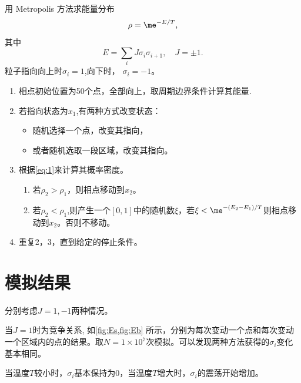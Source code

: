 \documentclass[12pt]{article}
\begin{document}
用 Metropolis 方法求能量分布
\begin{equation}
	\rho = \me^{-E/T},
	\label{eq:1}
\end{equation}
其中
\begin{equation}
	E = \sum_i J \sigma_i \sigma_{i+1}, \quad J = \pm 1.
\end{equation}
粒子指向向上时$\sigma_i=1$,向下时， $\sigma_i=-1$。

\begin{enumerate}
	\item 相点初始位置为50个点，全部向上，取周期边界条件计算其能量.
	\item 若指向状态为$x_1$,有两种方式改变状态：
	      \begin{itemize}
		      \item 随机选择一个点，改变其指向，
		      \item 或者随机选取一段区域，改变其指向。
	      \end{itemize}
	\item 根据\cref{eq:1}来计算其概率密度。
	      \begin{enumerate}
		      \item 若$\rho_2>\rho_1$，则相点移动到$x_2$。
		      \item 若$\rho_2<\rho_1$,则产生一个$[0,1]$中的随机数$\xi$，若$\xi<\me^{-(E_2-E_1)/T}$则相点移动到$x_2$。否则不移动。
	      \end{enumerate}
	\item 重复2，3，直到给定的停止条件。
\end{enumerate}

\section{模拟结果}

分别考虑$J=1,-1$两种情况。

当$J=1$时为竞争关系, 如\cref{fig:Es,fig:Eb} 所示，分别为每次变动一个点和每次变动一个区域内的点的结果。取$N=1\times 10^7$次模拟。可以发现两种方法获得的$\sigma_i$变化基本相同。

当温度$T$较小时，$\sigma_i$基本保持为0，当温度$T$增大时，$\sigma_i$的震荡开始增加。
\end{document}
